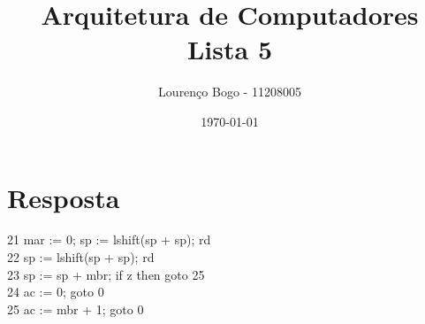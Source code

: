\documentclass[11pt]{article}
\author{Lourenço Bogo - 11208005}
\date{\today}
\title{Arquitetura de Computadores Lista 5}
\begin{document}
\maketitle

\section{Resposta}
\label{sec:orga50c3e4}
21 mar := 0; sp := lshift(sp + sp); rd\\
22 sp := lshift(sp + sp); rd\\
23 sp := sp + mbr; if z then goto 25\\
24 ac := 0; goto 0\\
25 ac := mbr + 1; goto 0\\
\end{document}
